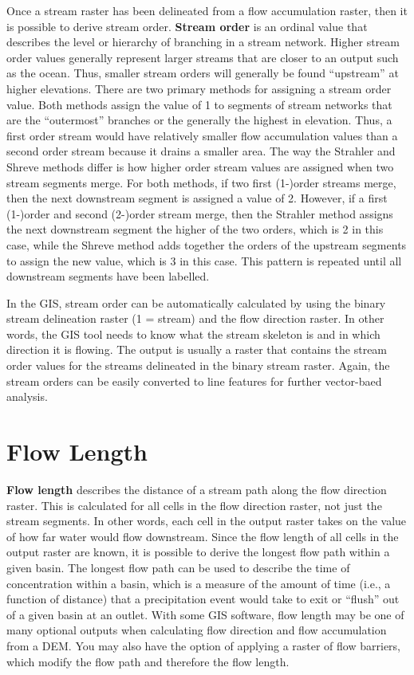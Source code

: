 \documentclass[
]{book}
\begin{document}
Once a stream raster has been delineated from a flow accumulation raster, then it is possible to derive stream order. \textbf{Stream order} is an ordinal value that describes the level or hierarchy of branching in a stream network. Higher stream order values generally represent larger streams that are closer to an output such as the ocean. Thus, smaller stream orders will generally be found ``upstream'' at higher elevations. There are two primary methods for assigning a stream order value. Both methods assign the value of 1 to segments of stream networks that are the ``outermost'' branches or the generally the highest in elevation. Thus, a first order stream would have relatively smaller flow accumulation values than a second order stream because it drains a smaller area. The way the Strahler \citep{strahler_quantitative_1957} and Shreve \citep{shreve_statistical_1966} methods differ is how higher order stream values are assigned when two stream segments merge. For both methods, if two first (1-)order streams merge, then the next downstream segment is assigned a value of 2. However, if a first (1-)order and second (2-)order stream merge, then the Strahler method assigns the next downstream segment the higher of the two orders, which is 2 in this case, while the Shreve method adds together the orders of the upstream segments to assign the new value, which is 3 in this case. This pattern is repeated until all downstream segments have been labelled.

In the GIS, stream order can be automatically calculated by using the binary stream delineation raster (1 = stream) and the flow direction raster. In other words, the GIS tool needs to know what the stream skeleton is and in which direction it is flowing. The output is usually a raster that contains the stream order values for the streams delineated in the binary stream raster. Again, the stream orders can be easily converted to line features for further vector-baed analysis.

\hypertarget{flow-length}{%
\section{Flow Length}\label{flow-length}}

\textbf{Flow length} describes the distance of a stream path along the flow direction raster. This is calculated for all cells in the flow direction raster, not just the stream segments. In other words, each cell in the output raster takes on the value of how far water would flow downstream. Since the flow length of all cells in the output raster are known, it is possible to derive the longest flow path within a given basin. The longest flow path can be used to describe the time of concentration within a basin, which is a measure of the amount of time (i.e., a function of distance) that a precipitation event would take to exit or ``flush'' out of a given basin at an outlet. With some GIS software, flow length may be one of many optional outputs when calculating flow direction and flow accumulation from a DEM. You may also have the option of applying a raster of flow barriers, which modify the flow path and therefore the flow length.
\end{document}

